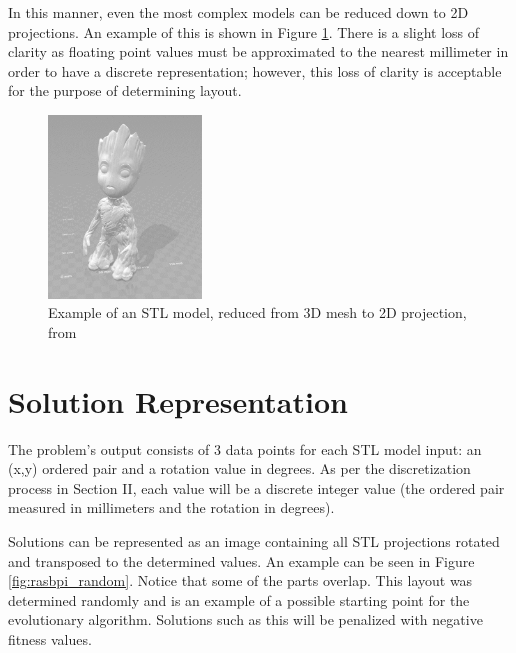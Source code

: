 \documentclass[conference]{IEEEtran}
\begin{document}
In this manner, even the most complex models can be reduced down to 2D projections. An example of this is shown in Figure \ref{fig:groot}. There is a slight loss of clarity as floating point values must be approximated to the nearest millimeter in order to have a discrete representation; however, this loss of clarity is acceptable for the purpose of determining layout.

\begin{figure}[ht]
\centering
\includegraphics[width=1.6in]{groot_3d.png}
\caption{Example of an STL model, reduced from 3D mesh to 2D projection, from \cite{model_groot}}
\label{fig:groot}
\end{figure}

\section{Solution Representation}
The problem’s output consists of 3 data points for each STL model input: an (x,y) ordered pair and a rotation value in degrees. As per the discretization process in Section II, each value will be a discrete integer value (the ordered pair measured in millimeters and the rotation in degrees).

Solutions can be represented as an image containing all STL projections rotated and transposed to the determined values. An example can be seen in Figure \ref{fig:rasbpi_random}. Notice that some of the parts overlap. This layout was determined randomly and is an example of a possible starting point for the evolutionary algorithm. Solutions such as this will be penalized with negative fitness values.
\end{document}
